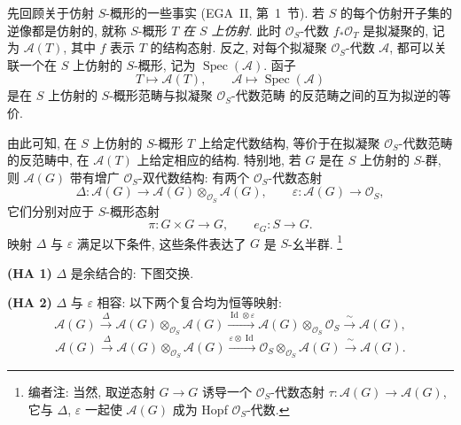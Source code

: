 先回顾关于仿射 \(S\)-概形的一些事实 (EGA~II, 第~1~节).
若 \(S\) 的每个仿射开子集的逆像都是仿射的, 就称 \(S\)-概形
\(T\) \emph{在 \(S\) 上仿射}. 此时 \(\mathcal O_S\)-代数
\(f_*\mathcal O_T\) 是拟凝聚的, 记为 \(\mathscr A(T)\), 其中 \(f\)
表示 \(T\) 的结构态射. 反之, 对每个拟凝聚 \(\mathcal O_S\)-代数
\(\mathscr A\), 都可以关联一个在 \(S\) 上仿射的 \(S\)-概形,
记为 \(\operatorname{Spec}(\mathscr A)\). 函子
\[
  T\longmapsto\mathscr A(T),
  \qquad
  \mathscr A\longmapsto\operatorname{Spec}(\mathscr A)
\]
是在 \(S\) 上仿射的 \(S\)-概形范畴与拟凝聚 \(\mathcal O_S\)-代数范畴
的反范畴之间的互为拟逆的等价.

由此可知, 在 \(S\) 上仿射的 \(S\)-概形 \(T\) 上给定代数结构,
等价于在拟凝聚 \(\mathcal O_S\)-代数范畴的反范畴中, 在
\(\mathscr A(T)\) 上给定相应的结构. 特别地, 若 \(G\) 是在 \(S\)
上仿射的 \(S\)-群, 则 \(\mathscr A(G)\) 带有增广
\(\mathcal O_S\)-双代数结构: 有两个 \(\mathcal O_S\)-代数态射
\[
  \Delta:\mathscr A(G)\longrightarrow
    \mathscr A(G)\otimes_{\mathcal O_S}\mathscr A(G),
  \qquad
  \varepsilon:\mathscr A(G)\longrightarrow\mathcal O_S,
\]
它们分别对应于 \(S\)-概形态射
\[
  \pi:G\times G\longrightarrow G,
  \qquad
  e_G:S\longrightarrow G.
\]
映射 \(\Delta\) 与 \(\varepsilon\) 满足以下条件, 这些条件表达了
\(G\) 是 \(S\)-幺半群.
\footnote{编者注: 当然, 取逆态射 \(G\to G\) 诱导一个
\(\mathcal O_S\)-代数态射 \(\tau:\mathscr A(G)\to\mathscr A(G)\),
它与 \(\Delta\), \(\varepsilon\) 一起使 \(\mathscr A(G)\) 成为
Hopf \(\mathcal O_S\)-代数.}

\medskip
\noindent\textbf{(HA 1)}
\(\Delta\) 是余结合的: 下图交换.

\begin{figure}[H]
  \centering
  
  \label{fig:sga3-exp1-p022-hopf-coassociativity}
\end{figure}

\noindent\textbf{(HA 2)}
\(\Delta\) 与 \(\varepsilon\) 相容: 以下两个复合均为恒等映射:
\[
  \mathscr A(G)
    \xrightarrow{\Delta}
  \mathscr A(G)\otimes_{\mathcal O_S}\mathscr A(G)
    \xrightarrow{\operatorname{Id}\otimes\varepsilon}
  \mathscr A(G)\otimes_{\mathcal O_S}\mathcal O_S
    \xrightarrow{\ \sim\ }
  \mathscr A(G),
\]
\[
  \mathscr A(G)
    \xrightarrow{\Delta}
  \mathscr A(G)\otimes_{\mathcal O_S}\mathscr A(G)
    \xrightarrow{\varepsilon\otimes\operatorname{Id}}
  \mathcal O_S\otimes_{\mathcal O_S}\mathscr A(G)
    \xrightarrow{\ \sim\ }
  \mathscr A(G).
\]


